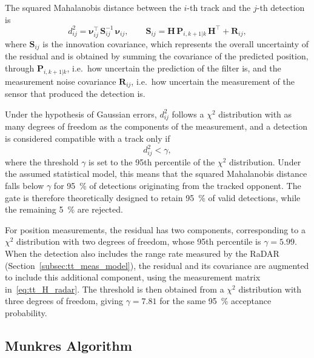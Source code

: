 The squared Mahalanobis distance between the $i$-th track and the $j$-th detection is
\begin{equation}
    d_{ij}^2 = \boldsymbol{\nu}_{ij}^\top\,\mathbf{S}_{ij}^{-1}\,\boldsymbol{\nu}_{ij},
    \qquad
    \mathbf{S}_{ij} = \mathbf{H}\,\mathbf{P}_{i,k+1|k}\,\mathbf{H}^\top + \mathbf{R}_{ij},
    \label{eq:tt_mahalanobis}
\end{equation}
where $\mathbf{S}_{ij}$ is the innovation covariance, which represents the overall
uncertainty of the residual and is obtained by summing the covariance of the predicted
position, through $\mathbf{P}_{i,k+1|k}$, i.e.\ how uncertain the prediction of the filter
is, and the measurement noise covariance $\mathbf{R}_{ij}$, i.e.\ how uncertain the
measurement of the sensor that produced the detection is.

Under the hypothesis of Gaussian errors, $d_{ij}^2$ follows a $\chi^2$ distribution with as
many degrees of freedom as the components of the measurement, and a detection is considered
compatible with a track only if
\begin{equation}
    d_{ij}^2 < \gamma,
    \label{eq:tt_gate}
\end{equation}
where the threshold $\gamma$ is set to the 95th percentile of the $\chi^2$ distribution. Under
the assumed statistical model, this means that the squared Mahalanobis distance falls below
$\gamma$ for \SI{95}{\percent} of detections originating from the tracked opponent. The gate is
therefore theoretically designed to retain \SI{95}{\percent} of valid detections, while the
remaining \SI{5}{\percent} are rejected.

For position measurements, the residual has two components, corresponding to a $\chi^2$
distribution with two degrees of freedom, whose 95th percentile is $\gamma = 5.99$. When the
detection also includes the range rate measured by the RaDAR
(Section~\ref{subsec:tt_meas_model}), the residual and its covariance are augmented to include
this additional component, using the measurement matrix in~\eqref{eq:tt_H_radar}. The
threshold is then obtained from a $\chi^2$ distribution with three degrees of freedom, giving
$\gamma = 7.81$ for the same \SI{95}{\percent} acceptance probability.

\subsection{Munkres Algorithm}
\label{subsec:tt_munkres}

